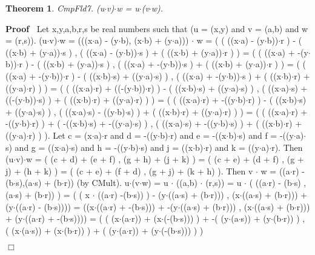 \documentclass{article}
\newenvironment{forthel}{\begin{leftbar}}{\end{leftbar}}
\newenvironment{proof}{\noindent\textbf{Proof\ }}{\hspace*{\fill}$\Box$\medskip}
\newtheorem{theorem}{Theorem}
\newcommand{\cmul}{\cdot}
\begin{document}
\begin{forthel}
\begin{theorem}
 CmpFld7. (u$\cmul$v)$\cmul$w = u$\cmul$(v$\cmul$w).
\end{theorem}\begin{proof}
 Let x,y,a,b,r,s be real numbers such that (u = (x,y) and v = (a,b) and w = (r,s)). 
(u$\cmul$v)$\cmul$w = (((x$\cdot$a) - (y$\cdot$b), (x$\cdot$b) + (y$\cdot$a))) $\cmul$ w 
= (  ( ((x$\cdot$a)  - (y$\cdot$b))$\cdot$r ) - ( ((x$\cdot$b) + (y$\cdot$a))$\cdot$s )  ,  ( ((x$\cdot$a)  - (y$\cdot$b))$\cdot$s ) + ( ((x$\cdot$b) + (y$\cdot$a))$\cdot$r ) )
= (  ( ((x$\cdot$a) + -(y$\cdot$b))$\cdot$r ) - ( ((x$\cdot$b) + (y$\cdot$a))$\cdot$s )  ,  ( ((x$\cdot$a) + -(y$\cdot$b))$\cdot$s ) + ( ((x$\cdot$b) + (y$\cdot$a))$\cdot$r ) )
= (  ( ((x$\cdot$a) + -(y$\cdot$b))$\cdot$r ) - ( ((x$\cdot$b)$\cdot$s) + ((y$\cdot$a)$\cdot$s) )  ,  ( ((x$\cdot$a) + -(y$\cdot$b))$\cdot$s ) + ( ((x$\cdot$b)$\cdot$r) + ((y$\cdot$a)$\cdot$r) )  )
= (  ( ((x$\cdot$a)$\cdot$r) + ((-(y$\cdot$b))$\cdot$r) ) - ( ((x$\cdot$b)$\cdot$s) + ((y$\cdot$a)$\cdot$s) )  ,  ( ((x$\cdot$a)$\cdot$s) + ((-(y$\cdot$b))$\cdot$s) ) + ( ((x$\cdot$b)$\cdot$r) + ((y$\cdot$a)$\cdot$r) )  ) 
= (  ( ((x$\cdot$a)$\cdot$r) + -((y$\cdot$b)$\cdot$r) ) - ( ((x$\cdot$b)$\cdot$s) + ((y$\cdot$a)$\cdot$s) )  ,  ( ((x$\cdot$a)$\cdot$s) - ((y$\cdot$b)$\cdot$s) ) + ( ((x$\cdot$b)$\cdot$r) + ((y$\cdot$a)$\cdot$r) )  )
= (  ( ((x$\cdot$a)$\cdot$r) + -((y$\cdot$b)$\cdot$r) ) + ( -((x$\cdot$b)$\cdot$s) + -((y$\cdot$a)$\cdot$s) )  ,  ( ((x$\cdot$a)$\cdot$s) + -((y$\cdot$b)$\cdot$s) ) + ( ((x$\cdot$b)$\cdot$r) + ((y$\cdot$a)$\cdot$r) )  ).
Let c = (x$\cdot$a)$\cdot$r and d = -((y$\cdot$b)$\cdot$r) and e = -((x$\cdot$b)$\cdot$s) and f = -((y$\cdot$a)$\cdot$s) and g = ((x$\cdot$a)$\cdot$s) and  h = -((y$\cdot$b)$\cdot$s) and  j = ((x$\cdot$b)$\cdot$r) and k = ((y$\cdot$a)$\cdot$r).
Then (u$\cmul$v)$\cmul$w =  ( (c + d) + (e  + f) , (g + h) +  (j + k)  )
=  ( (c + e) + (d + f) , (g +  j) + (h  + k) )
= ( (c + e) + (f + d) , (g + j) + (k + h) ).
Then v $\cmul$ w = ((a$\cdot$r) - (b$\cdot$s),(a$\cdot$s) + (b$\cdot$r)) (by CMult).
u$\cmul$(v$\cmul$w) = u $\cmul$ ((a,b) $\cmul$ (r,s)) 
= u $\cmul$ (  ((a$\cdot$r) - (b$\cdot$s) , (a$\cdot$s) + (b$\cdot$r))  )
= (  ( x $\cdot$ ((a$\cdot$r) -(b$\cdot$s)) ) - (y$\cdot$((a$\cdot$s) + (b$\cdot$r))) , (x$\cdot$((a$\cdot$s) + (b$\cdot$r))) + (y$\cdot$((a$\cdot$r) - (b$\cdot$s))))
= ((x$\cdot$((a$\cdot$r) + -(b$\cdot$s))) + -(y$\cdot$((a$\cdot$s) + (b$\cdot$r))) , (x$\cdot$((a$\cdot$s) 	+ (b$\cdot$r))) + (y$\cdot$((a$\cdot$r) + -(b$\cdot$s))))
= (  ( (x$\cdot$(a$\cdot$r)) + (x$\cdot$(-(b$\cdot$s))) ) + -( (y$\cdot$(a$\cdot$s)) + (y$\cdot$(b$\cdot$r)) )  , ( (x$\cdot$(a$\cdot$s)) + (x$\cdot$(b$\cdot$r)) ) + ( (y$\cdot$(a$\cdot$r)) + (y$\cdot$(-(b$\cdot$s))) ) )

\end{proof}
\end{forthel}
\end{document}
